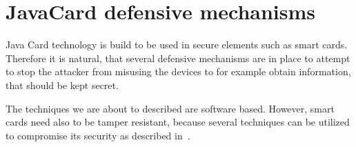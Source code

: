 {        %



        

        
    \section{JavaCard defensive mechanisms}

    Java Card technology is build to be used in secure elements such as smart cards. Therefore it is natural, that several defensive mechanisms are in place to attempt to stop the attacker from misusing the devices to for example obtain information, that should be kept secret.

The techniques we are about to described are software based. However, smart cards need also to be tamper resistant, because several techniques can be utilized to compromise its security as described in~\cite{kommerling}.

}
